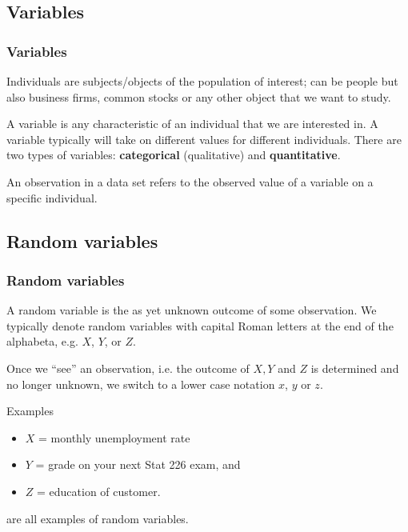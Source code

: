 \documentclass[handout]{beamer}
\begin{document}
\subsection{Variables}
\begin{frame}
\frametitle{Variables}

\begin{definition}
\alert{Individuals} are subjects/objects of the population of interest; can
be people but also business firms, common stocks or any other object
that we want to study.
\end{definition}

\pause

\begin{definition}
A \alert{variable} is any characteristic of an individual that we are
interested in.
\pause
A variable typically will take on different values for different individuals.
\pause
There are two types of variables:  \textbf{categorical}
(qualitative) and \textbf{quantitative}.
\end{definition}

\pause

\begin{definition}
An \alert{observation} in a data set refers to the observed value of a
variable on a specific individual.
\end{definition}
\end{frame}




\subsection{Random variables}
\begin{frame}
\frametitle{Random variables}

\begin{definition}
A \alert{random variable} is the as yet unknown outcome of some observation.
\pause
We typically denote random variables with capital Roman letters at the end of 
the alphabeta, e.g. $X$, $Y$, or $Z$.
\end{definition}

\vspace{0.1cm} \pause

Once we ``see'' an observation,
i.e. the outcome of $X, Y$ and $Z$ is determined and no longer unknown,
we switch to a lower case notation $x$, $y$ or $z$.

\vspace{0.1cm} \pause

Examples
\begin{itemize}[<+->]
\item $X$ = monthly unemployment rate
\item $Y$ = grade on your next Stat 226 exam, and
\item $Z$ = education of customer.
\end{itemize}
are all examples of random variables.
\end{frame}
\end{document}
